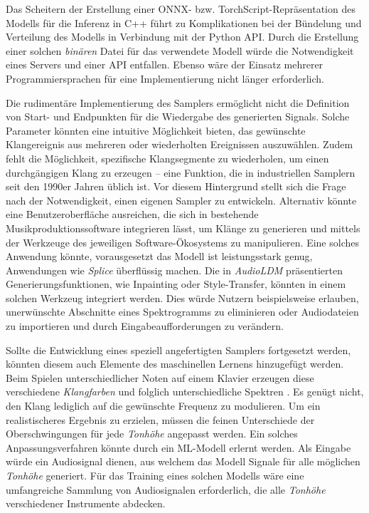 \documentclass[
  a4paper,  %
  twoside,  %
  bibliography=totoc,
  headsepline,
  cleardoublepage=empty,
  parskip=half,
  draft=false
]{scrbook}
\begin{document}
Das Scheitern der Erstellung einer ONNX- bzw. TorchScript-Repräsentation des Modells für die Inferenz in C++ führt zu Komplikationen bei der Bündelung und Verteilung des Modells in Verbindung mit der Python API. Durch die Erstellung einer solchen \emph{binären} Datei für das verwendete Modell würde die Notwendigkeit eines Servers und einer API entfallen. Ebenso wäre der Einsatz mehrerer Programmiersprachen für eine Implementierung nicht länger erforderlich.

Die rudimentäre Implementierung des Samplers ermöglicht nicht die Definition von Start- und Endpunkten für die Wiedergabe des generierten Signals. Solche Parameter könnten eine intuitive Möglichkeit bieten, das gewünschte Klangereignis aus mehreren oder wiederholten Ereignissen auszuwählen. Zudem fehlt die Möglichkeit, spezifische Klangsegmente zu wiederholen, um einen durchgängigen Klang zu erzeugen – eine Funktion, die in industriellen Samplern seit den 1990er Jahren üblich ist. Vor diesem Hintergrund stellt sich die Frage nach der Notwendigkeit, einen eigenen Sampler zu entwickeln. Alternativ könnte eine Benutzeroberfläche ausreichen, die sich in bestehende Musikproduktionssoftware integrieren lässt, um Klänge zu generieren und mittels der Werkzeuge des jeweiligen Software-Ökosystems zu manipulieren. Eine solches Anwendung könnte, vorausgesetzt das Modell ist leistungsstark genug, Anwendungen wie \emph{Splice} \cite{noauthor_royalty-free_nodate} überflüssig machen. Die in \emph{AudioLDM} \cite{liu_audioldm_2023} präsentierten Generierungsfunktionen, wie Inpainting oder Style-Transfer, könnten in einem solchen Werkzeug integriert werden. Dies würde Nutzern beispielsweise erlauben, unerwünschte Abschnitte eines Spektrogramms zu eliminieren oder Audiodateien zu importieren und durch Eingabeaufforderungen zu verändern.

Sollte die Entwicklung eines speziell angefertigten Samplers fortgesetzt werden, könnten diesem auch Elemente des maschinellen Lernens hinzugefügt werden. Beim Spielen unterschiedlicher Noten auf einem Klavier erzeugen diese verschiedene \emph{Klangfarben} und folglich unterschiedliche Spektren \cite{parker_good_2009}. Es genügt nicht, den Klang lediglich auf die gewünschte Frequenz zu modulieren. Um ein realistischeres Ergebnis zu erzielen, müssen die feinen Unterschiede der Oberschwingungen für jede \emph{Tonhöhe} angepasst werden. Ein solches Anpassungsverfahren könnte durch ein ML-Modell erlernt werden. Als Eingabe würde ein Audiosignal dienen, aus welchem das Modell Signale für alle möglichen \emph{Tonhöhe} generiert. Für das Training eines solchen Modells wäre eine umfangreiche Sammlung von Audiosignalen erforderlich, die alle \emph{Tonhöhe} verschiedener Instrumente abdecken.
\end{document}
